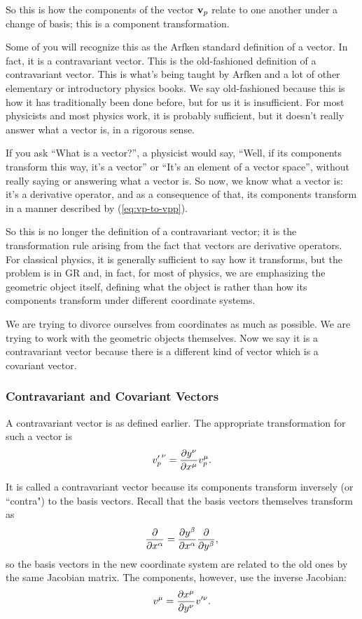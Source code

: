 		So this is how the components of the vector $\vb{v}_p$ relate to one another under
		a change of basis; this is a component transformation.

		Some of you will recognize this as the Arfken\cite{Arfken1985} standard definition of a vector. In fact, it is a contravariant vector.
		This is the old-fashioned definition of a contravariant vector. This is what's being taught by Arfken and a lot
		of other elementary or introductory physics books. We say old-fashioned because this is how it has traditionally been done
		before, but for us it is insufficient. For most physicists and most physics work, it is probably sufficient, but it doesn't
		really answer what a vector is, in a rigorous sense.

		If you ask ``What is a vector?'', a physicist would say, ``Well, if its components transform this way, it's a vector'' or ``It's an element of a vector space'', without
		really saying or answering what a vector is. So now, we know what a vector is: it's a derivative
		operator, and as a consequence of that, its components transform in a manner described by (\ref{eq:vp-to-vpp}).

		So this is no longer the definition of a contravariant vector; it is the transformation rule arising from the fact that
		vectors are derivative operators. For classical physics, it is generally sufficient to say how it transforms, but the problem is
		in GR and, in fact, for most of physics, we are emphasizing the geometric object itself, defining
		what the object is rather than how its components transform under different coordinate systems.

		We are trying to divorce ourselves from coordinates as much as possible. We are trying to work with the geometric objects themselves.
		Now we say it is a contravariant vector because there is a different kind of vector which is a covariant vector.

	\subsubsection{Contravariant and Covariant Vectors}

		A contravariant vector is as defined earlier. The appropriate transformation for such a vector is
		\[
			{v'_p}^\nu = \pdv{y^\nu}{x^\mu} v_p^\mu.
		\]

		It is called a contravariant vector because its components transform inversely (or ``contra") to the basis
		vectors. Recall that the basis vectors themselves transform as
		\[
		\pdv{}{x^\alpha} = \pdv{y^\beta}{x^\alpha} \pdv{}{y^\beta},
		\]
		so the basis vectors in the new coordinate system are related to the old ones by the same Jacobian matrix.
		The components, however, use the inverse Jacobian:
		\[
			v^\mu = \pdv{x^\mu}{y^\nu} v'^\nu.
		\]

